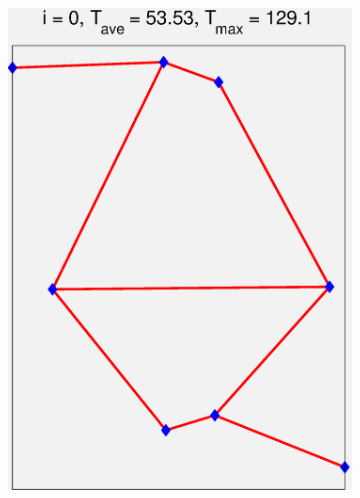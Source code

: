 \documentclass[11pt,letterpaper]{article}
\begin{document}
\begin{figure}[!h]
\centering
\begin{subfigure}{0.2\textwidth}
\includegraphics[width=\linewidth]{parallelTwo_Pmax30k_channel_0.eps}
\caption{}
\end{subfigure}
\begin{subfigure}{0.2\textwidth}

\end{subfigure}
\end{figure}
\end{document}
